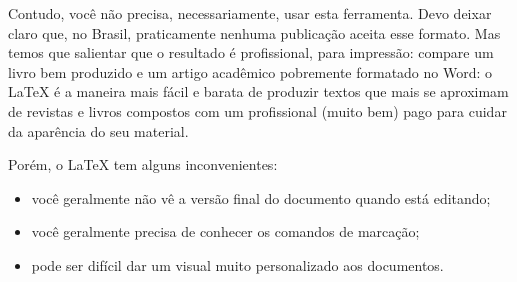 \documentclass[a4paper,nols,bidi,nohyper]{tufte-book}
\begin{document}


Contudo, você não precisa, necessariamente, usar esta ferramenta. Devo deixar claro que, no Brasil, praticamente nenhuma publicação aceita esse formato. Mas temos que salientar que o resultado é profissional, para impressão: compare um livro bem produzido e um artigo acadêmico pobremente formatado no Word: o \LaTeX{} é a maneira mais fácil e barata de produzir textos que mais se aproximam de revistas e livros compostos com um profissional (muito bem) pago para cuidar da aparência do seu material. 


Porém, o \LaTeX{} tem alguns inconvenientes:
 
\begin{itemize}

\item você geralmente não vê a versão final do documento quando está editando;
\item você geralmente precisa de conhecer os comandos de marcação;
\item pode ser difícil dar um visual muito personalizado aos documentos.
\end{itemize}
\end{document}
